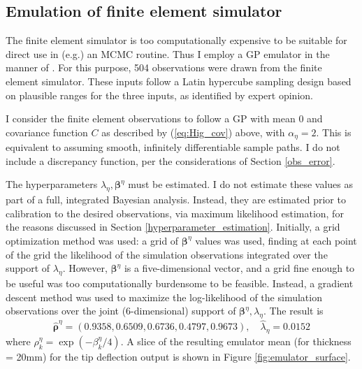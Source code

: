 \documentclass{article}
\begin{document}
\subsection{Emulation of finite element simulator}\label{emulator}
The finite element simulator is too computationally expensive to be suitable for direct use in (e.g.) an MCMC routine. 
Thus I employ a GP emulator in the manner of \cite{Williams2006}. For this purpose, 504 observations were drawn from the finite element simulator. 
These inputs follow a Latin hypercube sampling design \citep{McKay1979} based on plausible ranges for the three inputs, as identified by expert opinion.

I consider the finite element observations to follow a GP with mean 0 and covariance function $C$ as described by (\ref{eq:Hig_cov}) above, with $\alpha_\eta=2$. 
This is equivalent to assuming smooth, infinitely differentiable sample paths. I do not include a discrepancy function, per the considerations of Section \ref{obs_error}.

The hyperparameters $\lambda_\eta,\boldsymbol \beta^\eta$ must be estimated. 
I do not estimate these values as part of a full, integrated Bayesian analysis. 
Instead, they are estimated prior to calibration to the desired observations, via maximum likelihood estimation, for the reasons discussed in Section \ref{hyperparameter_estimation}. 
Initially, a grid optimization method was used: a grid of $\boldsymbol \beta^\eta$ values was used, finding at each point of the grid the likelihood of the simulation observations integrated over the support of $\lambda_\eta$. However, $\boldsymbol \beta^\eta$ is a five-dimensional vector, and a grid fine enough to be useful was too computationally burdensome to be feasible. Instead, a gradient descent method \citep{Cauchy1847} was used to maximize the log-likelihood of the simulation observations over the joint (6-dimensional) support of $\boldsymbol \beta^\eta,\lambda_\eta$.  The result is 
\begin{equation}\label{eq:MLEs}
\boldsymbol {\hat\rho}^\eta = (0.9358, 0.6509, 0.6736, 0.4797, 0.9673),\quad
\hat\lambda_\eta = 0.0152
\end{equation}
where $\rho^\eta_k = \exp(-\beta_k^\eta/4)$. A slice of the resulting emulator mean (for thickness = 20mm) for the tip deflection output is shown in Figure \ref{fig:emulator_surface}.
\end{document}
